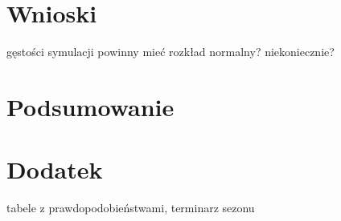 \documentclass[inzynierska]{pwr_wmat_praca_dyplomowa}
\theoremstyle{plain}
\numberwithin{theorem}{chapter}
\theoremstyle{definition}
\numberwithin{theorem}{chapter}
\begin{document}
\chapter{Wnioski}
gęstości symulacji powinny mieć rozkład normalny? niekoniecznie?

{\backmatter \chapter{Podsumowanie}}

{\backmatter \chapter{Dodatek}}
tabele z prawdopodobieństwami, terminarz sezonu

\newpage
\end{document}
